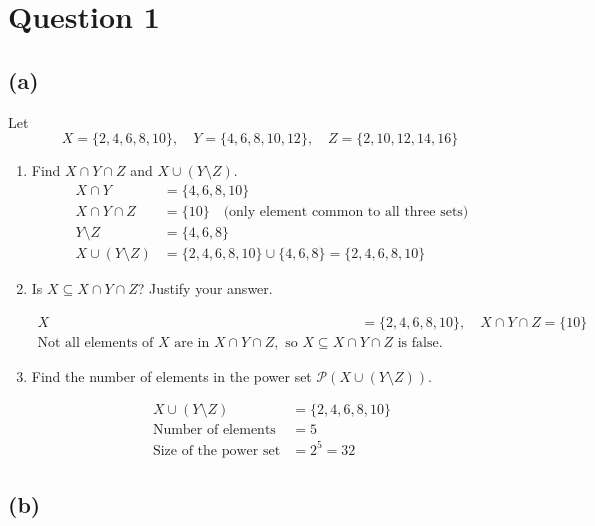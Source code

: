 \documentclass{article}
\begin{document}
\section*{Question 1}

\subsection*{(a)}

Let 
\[
X = \{2, 4, 6, 8, 10\}, \quad Y = \{4, 6, 8, 10, 12\}, \quad Z = \{2, 10, 12, 14, 16\}
\]

\begin{enumerate}[label=\roman*.]

\item Find $X \cap Y \cap Z$ and $X \cup (Y \setminus Z)$.
\[
\begin{aligned}
X \cap Y &= \{4, 6, 8, 10\} \\
X \cap Y \cap Z &= \{10\} \quad \text{(only element common to all three sets)} \\
Y \setminus Z &= \{4, 6, 8\} \\
X \cup (Y \setminus Z) &= \{2, 4, 6, 8, 10\} \cup \{4, 6, 8\} = \{2, 4, 6, 8, 10\}
\end{aligned}
\]

\item Is $X \subseteq X \cap Y \cap Z$? Justify your answer.

\[
\begin{aligned}
X &= \{2, 4, 6, 8, 10\}, \quad X \cap Y \cap Z = \{10\} \\
\text{Not all elements of } X \text{ are in } X \cap Y \cap Z, \text{ so } X \subseteq X \cap Y \cap Z \text{ is false.}
\end{aligned}
\]

\item Find the number of elements in the power set $\mathcal{P}(X \cup (Y \setminus Z))$.

\[
\begin{aligned}
X \cup (Y \setminus Z) &= \{2, 4, 6, 8, 10\} \\
\text{Number of elements} &= 5 \\
\text{Size of the power set} &= 2^5 = \boxed{32}
\end{aligned}
\]

\end{enumerate}

\subsection*{(b)}
\end{document}
